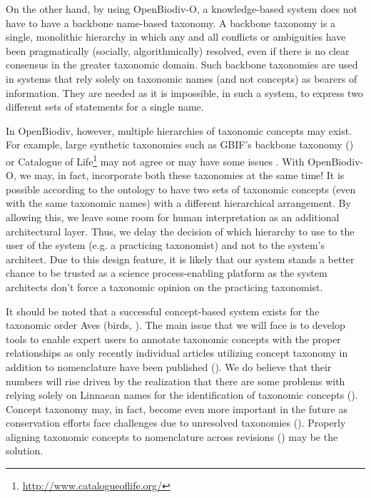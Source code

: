 On the other hand, by using \mbox{OpenBiodiv-O}, a knowledge-based system does not have to have a backbone name-based taxonomy. A backbone taxonomy is a single, monolithic hierarchy in which any and all conflicts or ambiguities have been pragmatically (socially, algorithmically) resolved, even if there is no clear consensus in the greater taxonomic domain. Such backbone taxonomies are used in systems that rely solely on taxonomic names (and not concepts) as bearers of information. They are needed as it is impossible, in such a system, to express two different sets of statements for a single name.

In OpenBiodiv, however, multiple hierarchies of taxonomic concepts may exist. For example, large synthetic taxonomies such as GBIF's backbone taxonomy (\cite{gbif_secretariat_gbif_2017}) or Catalogue of Life\footnote{\href{http://www.catalogueoflife.org/}{http://www.catalogueoflife.org/}} may not agree or may have some issues \cite{page_gbif_2012}. With OpenBiodiv-O, we may, in fact, incorporate both these taxonomies at the same time! It is possible according to the ontology to have two sets of taxonomic concepts (even with the same taxonomic names) with a different hierarchical arrangement. By allowing this, we leave some room for human interpretation as an additional architectural layer. Thus, we delay the decision of which hierarchy to use to the user of the system (e.g. a practicing taxonomist) and not to the system's architect. Due to this design feature, it is likely that our system stands a better chance to be trusted as a science process-enabling platform as the system architects don't force a taxonomic opinion on the practicing taxonomist.

It should be noted that a successful concept-based system exists for the taxonomic order Aves (birds, \cite{lepage_avibase_2014}). The main issue that we will face is to develop tools to enable expert users to annotate taxonomic concepts with the proper relationships as only recently individual articles utilizing concept taxonomy in addition to nomenclature have been published (\cite{franz_two_2016,jansen_phylogenetic_2015,franz_three_2017}). We do believe that their numbers will rise driven by the realization that there are some problems with relying solely on Linnaean names for the identification of taxonomic concepts (\cite{patterson_names_2010,remsen_use_2016, franz_names_2016}). Concept taxonomy may, in fact, become even more important in the future as conservation efforts face challenges due to unresolved taxonomies (\cite{garnett_taxonomy_2017}). Properly aligning taxonomic concepts to nomenclature across revisions (\cite{franz_logic_2016-1}) may be the solution.

